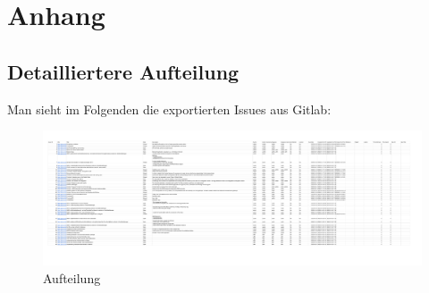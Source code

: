 \section{Anhang}\label{Anhang}
\subsection{Detailliertere Aufteilung}
Man sieht im Folgenden die exportierten Issues aus Gitlab:
\begin{figure}[H]
    \centerline{\includegraphics[scale= 0.7]{res/daniel_aufteilung_cropped.pdf}}
    \caption{Aufteilung}
    \end{figure}
\pagebreak